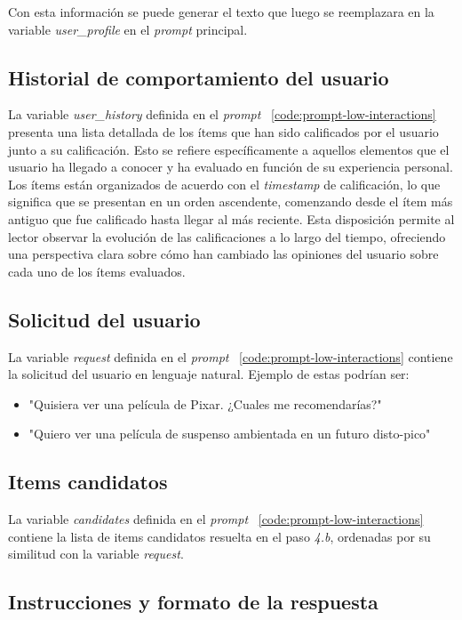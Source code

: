 \documentclass[11pt,a4paper,twoside]{thesis}
\begin{document}
Con esta información se puede generar el texto que luego se reemplazara en la variable \textit{user\_profile} en el \textit{prompt} principal.

\subsection{Historial de comportamiento del usuario}

La variable \textit{user\_history} definida en el \textit{prompt} ~\ref{code:prompt-low-interactions} presenta una lista detallada de los ítems que han sido calificados por el usuario junto a su calificación. Esto se refiere específicamente a aquellos elementos que el usuario ha llegado a conocer y ha evaluado en función de su experiencia personal. Los ítems están organizados de acuerdo con el \textit{timestamp} de calificación, lo que significa que se presentan en un orden ascendente, comenzando desde el ítem más antiguo que fue calificado hasta llegar al más reciente. Esta disposición permite al lector observar la evolución de las calificaciones a lo largo del tiempo, ofreciendo una perspectiva clara sobre cómo han cambiado las opiniones del usuario sobre cada uno de los ítems evaluados.

\subsection{Solicitud del usuario}

La variable \textit{request} definida en el \textit{prompt} ~\ref{code:prompt-low-interactions} contiene la solicitud del usuario en lenguaje natural. Ejemplo de estas podrían ser:

\begin{itemize}
	\item "Quisiera ver una película de Pixar. ¿Cuales me recomendarías?"
	\item "Quiero ver una película de suspenso ambientada en un futuro disto-pico"
\end{itemize}
\subsection{Items candidatos}

La variable \textit{candidates} definida en el \textit{prompt} ~\ref{code:prompt-low-interactions} contiene la lista de items candidatos resuelta en el paso \textit{4.b}, ordenadas por su similitud con la variable \textit{request}.

\subsection{Instrucciones y formato de la respuesta}
\end{document}

